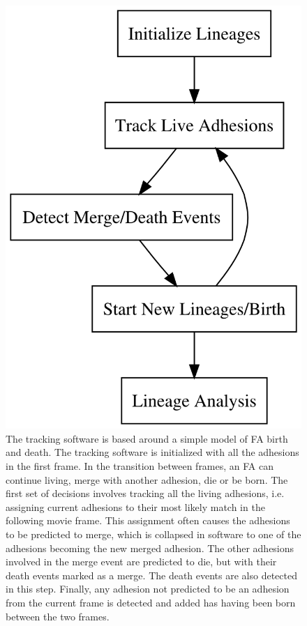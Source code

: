 \documentclass[letterpaper]{article}
\begin{document}
\begin{figure}[htbp]
\begin{center}
\includegraphics{../figures/supplemental/tracking_flowchart}
\caption{The tracking software is based around a simple model of FA birth and
death. The tracking software is initialized with all the adhesions in the first
frame. In the transition between frames, an FA can continue living, merge with
another adhesion, die or be born. The first set of decisions involves tracking
all the living adhesions, i.e. assigning current adhesions to their most likely
match in the following movie frame. This assignment often causes the adhesions
to be predicted to merge, which is collapsed in software to one of the adhesions
becoming the new merged adhesion. The other adhesions involved in the merge
event are predicted to die, but with their death events marked as a merge. The
death events are also detected in this step. Finally, any adhesion not predicted
to be an adhesion from the current frame is detected and added has having been
born between the two frames.}
\label{default}
\end{center}
\end{figure}
\end{document}
